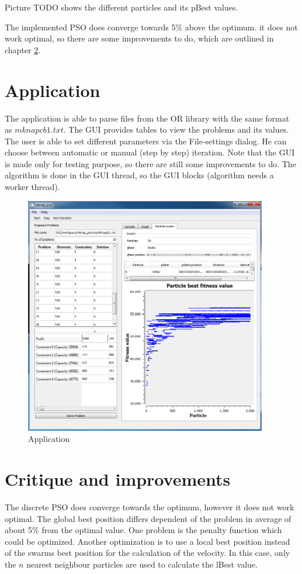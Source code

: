 \documentclass{article}
\begin{document}
Picture TODO shows the different particles and its pBest values.

The implemented PSO does converge towards 5\% above the optimum. it does not work optimal, so there are some improvements to do, which are outlined in chapter \ref{lbl-impr}.

\section{Application}
\label{lbl-app}
The application is able to parse files from the OR library with the same format as $mknapcb1.txt$. The GUI   provides tables to view the problems and its values. The user is able to set different parameters via the File-settings dialog. He can choose between automatic or manual (step by step) iteration. Note that the GUI is made only for testing purpose, so there are still some improvements to do. The algorithm is done in the GUI thread, so the GUI blocks (algorithm needs a worker thread).

\begin{figure}[H]
    \centering
    \includegraphics[width=400px]{images/image_main.PNG}
    \caption{Application}
    \label{fig-app}
\end{figure}

\section{Critique and improvements}
\label{lbl-impr}
The discrete PSO does converge towards the optimum, however it does not work optimal. The global best position differs dependent of the problem in average of about 5\% from the optimal value. One problem is the penalty function which could be optimized. Another optimization is to use a local best position instead of the swarms best position for the calculation of the velocity. In this case, only the $n$ nearest neighbour particles are used to calculate the lBest value.
\end{document}
